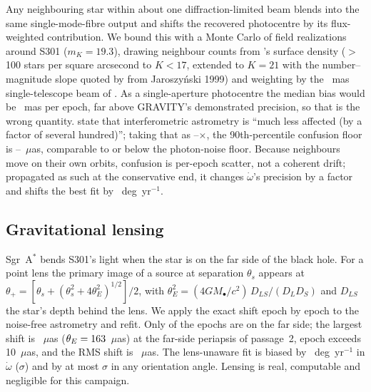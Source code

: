 \documentclass{aastex701}
\begin{document}
Any neighbouring star within about one diffraction-limited beam blends into the same single-mode-fibre output and shifts the recovered photocentre by its flux-weighted contribution. We bound this with a Monte Carlo of \confusionNMc{} field realizations around S301 ($m_K=19.3$), drawing neighbour counts from \citet{gravity2022massdist}'s surface density ($>$100 stars per square arcsecond to $K<17$, extended to $K=21$ with the number--magnitude slope quoted by \citeauthor{rubilar2001} from Jaroszy\'nski 1999) and weighting by the \confusionBeamFwhmMas{}~mas single-telescope beam of \citet{gravity2020}. As a single-aperture photocentre the median bias would be \confusionNaiveMedianMas{}~mas per epoch, far above GRAVITY's demonstrated precision, so that is the wrong quantity. \citet{gravity2022massdist} state that interferometric astrometry is ``much less affected (by a factor of several hundred)''; taking that as \confusionSuppressionLow{}--\confusionSuppressionHigh{}$\times$, the 90th-percentile confusion floor is \confusionFloorPNineZeroHighUas{}--\confusionFloorPNineZeroLowUas{}~$\mu$as, comparable to or below the photon-noise floor. Because neighbours move on their own orbits, confusion is per-epoch scatter, not a coherent drift; propagated as such at the conservative end, it changes $\dot\omega$'s precision by a factor \confusionSigmaRatio{} and shifts the best fit by \confusionBestFitShift{}~deg~yr$^{-1}$.

\subsection{Gravitational lensing}
\label{sec:lensing}

Sgr~A$^*$ bends S301's light when the star is on the far side of the black hole. For a point lens the primary image of a source at separation $\theta_s$ appears at $\theta_+ = [\theta_s + (\theta_s^2 + 4\theta_E^2)^{1/2}]/2$, with $\theta_E^2 = (4GM_\bullet/c^2)\,D_{LS}/(D_L D_S)$ and $D_{LS}$ the star's depth behind the lens. We apply the exact shift epoch by epoch to the noise-free astrometry and refit. Only \lensingNFarSide{} of the \campaignNEpochs{} epochs are on the far side; the largest shift is \lensingMaxShiftUas{}~$\mu$as ($\theta_E = 163{}$~$\mu$as) at the far-side periapsis of passage~2, \lensingNShiftGtOneZerouas{} epoch exceeds 10~$\mu$as, and the RMS shift is \lensingRmsShiftUas{}~$\mu$as. The lens-unaware fit is biased by \lensingOmegaDotBias{}~deg~yr$^{-1}$ in $\dot\omega$ (\lensingOmegaDotBiasNsigma{}$\sigma$) and by at most \lensingMaxAngleBiasNsigma{}$\sigma$ in any orientation angle. Lensing is real, computable and negligible for this campaign.
\end{document}

